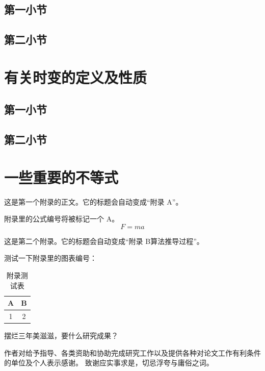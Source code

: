 \documentclass[bibbackend=biber]{csuthesis}
\theoremstyle{csutheorem}
\begin{document}
\subsection{第一小节}
\subsection{第二小节}
\section{有关时变的定义及性质}
\subsection{第一小节}
\subsection{第二小节}
\section{一些重要的不等式}

\makecsureferencepage
\begin{csuappendix}\label{my-first-appendix}
    这是第一个附录的正文。它的标题会自动变成“附录 A”。
    
    附录里的公式编号将被标记一个 A。
    \begin{equation}
        F = ma
    \end{equation}
\end{csuappendix}
\begin{csuappendix}[算法推导过程]
    这是第二个附录。它的标题会自动变成“附录 B\quad 算法推导过程”。
    
    测试一下附录里的图表编号：
    \begin{table}[ht]
        \centering
        \caption{附录测试表} %
        \begin{tabular}{cc}
            \toprule
            A & B \\
            \midrule
            1 & 2 \\
            \bottomrule
        \end{tabular}
    \end{table}
\end{csuappendix}

\begin{cnresearchresult}
摆烂三年美滋滋，要什么研究成果？
\end{cnresearchresult}
\begin{cnthanks}
作者对给予指导、各类资助和协助完成研究工作以及提供各种对论文工作有利条件的单位及个人表示感谢。
致谢应实事求是，切忌浮夸与庸俗之词。
\end{cnthanks}
\end{document}
